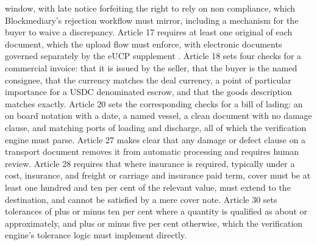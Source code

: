 \documentclass[12pt, a4paper]{article}
\begin{document}
window, with late notice forfeiting the right to rely on non compliance, which
Blockmediary's rejection workflow must mirror, including a mechanism for the buyer to
waive a discrepancy. Article 17 requires at least one original of each document, which the
upload flow must enforce, with electronic documents governed separately by the eUCP
supplement \citep{eucp}. Article 18 sets four checks for a commercial invoice: that it is
issued by the seller, that the buyer is the named consignee, that the currency matches the
deal currency, a point of particular importance for a USDC denominated escrow, and that
the goods description matches exactly. Article 20 sets the corresponding checks for a bill
of lading: an on board notation with a date, a named vessel, a clean document with no
damage clause, and matching ports of loading and discharge, all of which the verification
engine must parse. Article 27 makes clear that any damage or defect clause on a transport
document removes it from automatic processing and requires human review. Article 28
requires that where insurance is required, typically under a cost, insurance, and freight
or carriage and insurance paid term, cover must be at least one hundred and ten per cent
of the relevant value, must extend to the destination, and cannot be satisfied by a mere
cover note. Article 30 sets tolerances of plus or minus ten per cent where a quantity is
qualified as about or approximately, and plus or minus five per cent otherwise, which the
verification engine's tolerance logic must implement directly.
\end{document}
